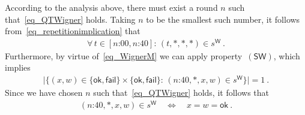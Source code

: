 \documentclass{article}
\theoremstyle{plain}
\theoremstyle{definition}
\newcommand*{\Friendone}{\mathsf{F1}}
\newcommand*{\Friendtwo}{\mathsf{F2}}
\newcommand*{\Assistant}{\mathsf{A}}
\newcommand*{\Wigner}{\mathsf{W}}
\newcommand*{\SW}{\mathsf{(SW)}}
\newcommand*{\ok}{\mathsf{ok}}
\newcommand*{\fail}{\mathsf{fail}}
\begin{document}
According to the analysis above, there must exist a round $n$ such that~\eqref{eq_QTWigner} holds. Taking $n$ to be the smallest such number, it follows from~\eqref{eq_repetitionimplication} that
\begin{align} \label{eq_repeatimpl}
  \forall \,  t \in [\text{$n$:00}, \text{$n$:40}] :\,  (t, *, *, *) \in s^{\Wigner}  \ .
\end{align}
Furthermore, by virtue of~\eqref{eq_WignerM} we can apply property~$\SW$, which implies
\begin{align} \label{eq_ywsingle}
    \bigl| \bigl\{(x, w) \in \{\ok, \fail\} \times  \{\ok, \fail\}  : \,  (\text{$n$:40}, *, x, w) \in s^{\Wigner} \bigr\} \bigr| = 1 \ .
\end{align}
Since we have chosen $n$ such that~\eqref{eq_QTWigner} holds, it follows that  
\begin{align} \label{eq_QTWignere}
  (\text{$n$:40}, *, x,  w) \in s^{\Wigner} \quad \iff \quad x = w = \ok \ .
\end{align}
\end{document}
